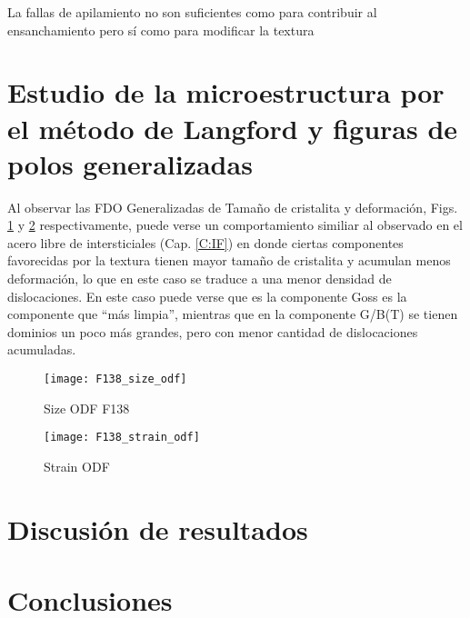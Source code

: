 La fallas de apilamiento no son suficientes como para contribuir al ensanchamiento pero sí como para modificar la textura


\newpage
\section{Estudio de la microestructura por el método de Langford y figuras de polos generalizadas}\label{S:F138LANG}
Al observar las FDO Generalizadas de Tamaño de cristalita y deformación, Figs. \ref{fig:F138Size} y \ref{fig:F138Strain} respectivamente, puede verse un comportamiento similiar al observado en el acero libre de intersticiales (Cap. \ref{C:IF}) en donde ciertas componentes favorecidas por la textura tienen mayor tamaño de cristalita y acumulan menos deformación, lo que en este caso se traduce a una menor densidad de dislocaciones.
En este caso puede verse que es la componente Goss es la componente que ``más limpia'', mientras que en la componente G/B(T) se tienen dominios un poco más grandes, pero con menor cantidad de dislocaciones acumuladas.
\begin{figure}[!htb]
  \centering
  \texttt{[image: F138\_size\_odf]}
  \caption{Size ODF F138}
  \label{fig:F138Size}
\end{figure}

\begin{figure}[!htb]
  \centering
  \texttt{[image: F138\_strain\_odf]}
  \caption{Strain ODF}
  \label{fig:F138Strain}
\end{figure}




\newpage
\section{Discusión de resultados}\label{S:F138Dis}
\newpage
\section{Conclusiones}\label{S:F138Conclusiones}
